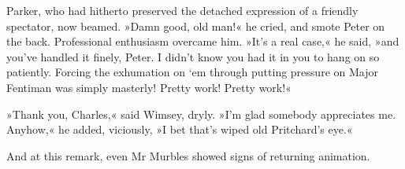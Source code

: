 Parker, who had hitherto preserved the detached expression of a friendly spectator, now beamed. »Damn good, old man!« he cried, and smote Peter on the back. Professional enthusiasm overcame him. »It's a real case,« he said, »and you've handled it finely, Peter. I didn't know you had it in you to hang on so patiently. Forcing the exhumation on `em through putting pressure on Major Fentiman was simply masterly! Pretty work! Pretty work!«

»Thank you, Charles,« said Wimsey, dryly. »I'm glad somebody appreciates me. Anyhow,« he added, viciously, »I bet that's wiped old Pritchard's eye.«

And at this remark, even Mr Murbles showed signs of returning animation.